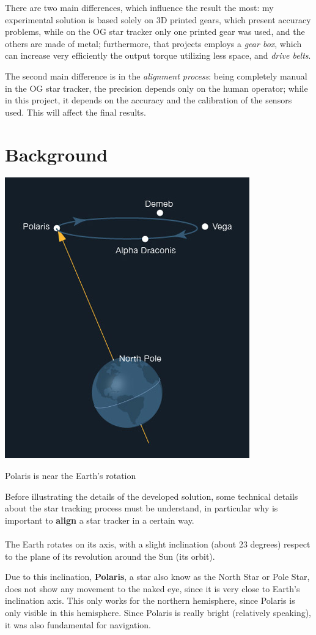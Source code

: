 \documentclass[]{article}
\begin{document}
There are two main differences, which influence the result the most: my experimental solution is based solely on 3D printed gears, which present accuracy problems, while on the OG star tracker only one printed gear was used, and the others are made of metal; furthermore, that projects employs a \textit{gear box}, which can increase very efficiently the output torque utilizing less space, and \textit{drive belts}. 

The second main difference is in the \textit{alignment process}: being completely manual in the OG star tracker, the precision depends only on the human operator; while in this project, it depends on the accuracy and the calibration of the sensors used. This will affect the final results. 

\newpage

\section{Background}\label{sec:intro}

\begin{floatingfigure}[p]{0.35\linewidth}
	\centering
	\includegraphics[width=0.35\linewidth]{images/background/2-1-precession-400x4591_nasa.jpg}
	\caption{Polaris is near the Earth's rotation \\}
	\label{fig:polarisnasa}
\end{floatingfigure}	


Before illustrating the details of the developed solution, some technical details about the star tracking process must be understand, in particular why is important to \textbf{align} a star tracker in a certain way. 
\\
\\
The Earth rotates on its axis, with a slight inclination (about 23 degrees) respect to the plane of its revolution around the Sun (its orbit).

Due to this inclination, \textbf{Polaris}, a star also know as the North Star or Pole Star, does not show any movement to the naked eye, since it is very close to Earth's inclination axis. This only works for the northern hemisphere, since Polaris is only visible in this hemisphere. Since Polaris is really bright (relatively speaking), it was also fundamental for navigation. 
\end{document}

